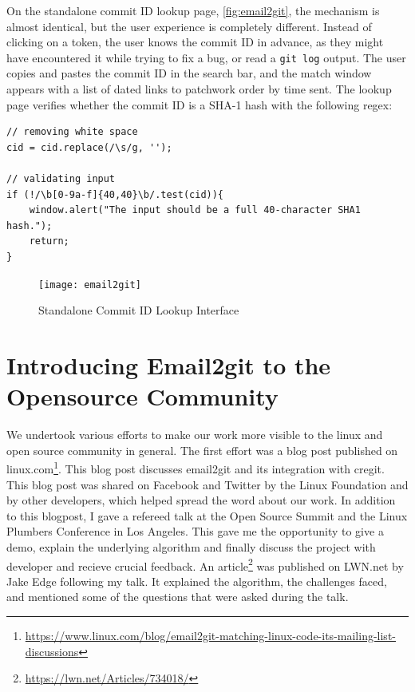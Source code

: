 On the standalone commit ID lookup page, \autoref{fig:email2git}, the mechanism is almost identical, but the user experience is completely different. Instead of clicking on a token, the user knows the commit ID in advance, as they might have encountered it while trying to fix a bug, or read a \texttt{git log} output. The user copies and pastes the commit ID in the search bar, and the match window appears with a list of dated links to patchwork order by time sent. The lookup page verifies whether the commit ID is a SHA-1 hash with the following regex:



\begin{lstlisting}
// removing white space
cid = cid.replace(/\s/g, '');

// validating input
if (!/\b[0-9a-f]{40,40}\b/.test(cid)){
    window.alert("The input should be a full 40-character SHA1 hash.");
    return;
}
\end{lstlisting}

\begin{figure}[htb]
\centering
\texttt{[image: email2git]}
\caption{Standalone Commit ID Lookup Interface}
\label{fig:email2git}
\end{figure}



\section{Introducing Email2git to the Opensource Community}

We undertook various efforts to make our work more visible to the linux and open source community in general. The first effort was a blog post published on linux.com\footnote{\url{https://www.linux.com/blog/email2git-matching-linux-code-its-mailing-list-discussions}}. This blog post discusses email2git and its integration with cregit. This blog post was shared on Facebook and Twitter by the Linux Foundation and by other developers, which helped spread the word about our work. In addition to this blogpost, I gave a refereed talk at the Open Source Summit and the Linux Plumbers Conference in Los Angeles. This gave me the opportunity to give a demo, explain the underlying algorithm and finally discuss the project with developer and recieve crucial feedback. An article\footnote{\url{https://lwn.net/Articles/734018/}} was published on LWN.net by Jake Edge following my talk. It explained the algorithm, the challenges faced, and mentioned some of the questions that were asked during the talk.


